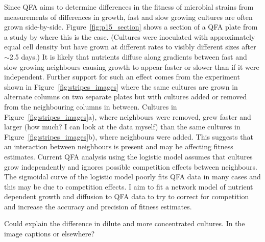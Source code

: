 Since QFA aims to determine differences in the fitness of microbial
strains from measurements of differences in growth, fast and slow
growing cultures are often grown
side-by-side. Figure~\ref{fig:p15_section} shows a section of a QFA
plate from a study by \citeauthor*{Addinall2011} where this is the
case. (Cultures were inoculated with approximately equal cell density
but have grown at different rates to visibly different sizes after
\(\sim\)2.5 days.) It is likely that nutrients diffuse along gradients
between fast and slow growing neighbours causing growth to appear
faster or slower than if it were independent. Further support for such
an effect comes from the experiment shown in
Figure~\ref{fig:stripes_images} where the same cultures are grown in
alternate columns on two separate plates but with cultures added or
removed from the neighbouring columns in between. Cultures in
Figure~\ref{fig:stripes_images}a), where neighbours were removed, grew
faster and larger (how much? I can look at the data myself) than the
same cultures in Figure~\ref{fig:stripes_images}b), where neighbours
were added. This suggests that an interaction between neighbours is
present and may be affecting fitness estimates. Current QFA analysis
using the logistic model assumes that cultures grow independently and
ignores possible competition effects between neighbours. The sigmoidal
curve of the logistic model poorly fits QFA data in many cases and
this may be due to competition effects. I aim to fit a network model of
nutrient dependent growth and diffusion to QFA data to try to correct
for competition and increase the accuracy and precision of fitness
estimates.

Could explain the difference in dilute and more concentrated
cultures. In the image captions or elsewhere?


